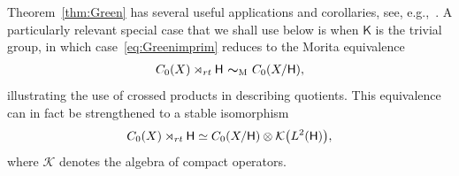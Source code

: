 \documentclass[11pt]{article}
\numberwithin{equation}{section}
\numberwithin{equation}{section}
\newcommand{\mbf}[1]{{\boldsymbol {#1} }}
\newcommand{\CK}{\mathcal{K}}
\newcommand{\sfH}{\mathsf{H}}
\newcommand{\sfK}{\mathsf{K}}
\newcommand{\Leb}{{\rm L}}
\newcommand{\rt}{{\rm rt}}
\begin{document}
Theorem~\ref{thm:Green} has several useful applications and
corollaries, see, e.g.,~\cite{Rieffel1976}. A particularly relevant
special case that we shall use below is when $\sfK $ is the trivial group,
in which case~\eqref{eq:Greenimprim} reduces to the Morita equivalence
\begin{gather*}%
C_0(X)\rtimes_\rt \sfH \ \mbf\sim_{\text{\tiny M}} \ C_0(X/\sfH ) ,
\end{gather*}
illustrating the use of crossed products in describing
quotients. This equivalence can in fact be strengthened to a stable
isomorphism~\cite{Rieffel1976}
\begin{gather}\label{eq:XsfHiso}
C_0(X)\rtimes_\rt \sfH \simeq C_0(X/\sfH ) \otimes \CK\big(\Leb^2(\sfH)\big) ,
\end{gather}
where $\CK$ denotes the algebra of
compact operators.
\end{document}
